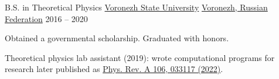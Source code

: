 
\begin{cventries}

	\cventry
	{B.S. in Theoretical Physics}
	{\href{https://www.linkedin.com/school/\%D0\%B2\%D0\%BE\%D1\%80\%D0\%BE\%D0\%BD\%D0\%B5\%D0\%B6\%D1\%81\%D0\%BA\%D0\%B8\%D0\%B9-\%D0\%B3\%D0\%BE\%D1\%81\%D1\%83\%D0\%B4\%D0\%B0\%D1\%80\%D1\%81\%D1\%82\%D0\%B2\%D0\%B5\%D0\%BD\%D0\%BD\%D1\%8B\%D0\%B9-\%D1\%83\%D0\%BD\%D0\%B8\%D0\%B2\%D0\%B5\%D1\%80\%D1\%81\%D0\%B8\%D1\%82\%D0\%B5\%D1\%82}{Voronezh State University}}
	{\href{https://www.google.com/maps/place/Voronezh,+Voronezh+Oblast,+Russia}{Voronezh, Russian Federation}}
	{2016 -- 2020}
	{
		\begin{cvitems}
			\item {Obtained a governmental scholarship. Graduated with honors.}
			\item {Theoretical physics lab assistant (2019): wrote computational programs for research later published as \href{https://journals.aps.org/pra/abstract/10.1103/PhysRevA.106.033117}{Phys. Rev. A 106, 033117 (2022)}.}
		\end{cvitems}
	}

\end{cventries}
